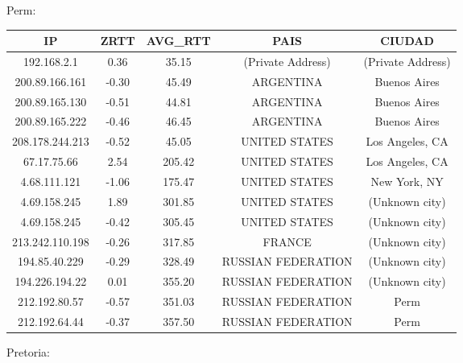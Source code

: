Perm:

\begin{tabular}{|c@{\hspace{5ex}}c@{\hspace{5ex}}c@{\hspace{5ex}}c@{\hspace{5ex}}c|}
 \hline
 \rule{0pt}{1.2em}IP & ZRTT & AVG\_RTT & PAIS & CIUDAD\\[0.2em]
 \hline

\rule{0pt}{1.2em} 192.168.2.1  &  0.36 & 35.15 & (Private Address) & (Private Address) \\[0.2em]
\rule{0pt}{1.2em} 200.89.166.161  &  -0.30 & 45.49 & ARGENTINA & Buenos Aires \\[0.2em]
\rule{0pt}{1.2em} 200.89.165.130  &  -0.51 & 44.81 & ARGENTINA & Buenos Aires \\[0.2em]
\rule{0pt}{1.2em} 200.89.165.222  &  -0.46 & 46.45 & ARGENTINA & Buenos Aires \\[0.2em]
\rule{0pt}{1.2em} 208.178.244.213  &  -0.52 & 45.05 & UNITED STATES & Los Angeles, CA \\[0.2em]
\rule{0pt}{1.2em} 67.17.75.66  &  2.54 & 205.42 & UNITED STATES & Los Angeles, CA \\[0.2em]
\rule{0pt}{1.2em} 4.68.111.121  &  -1.06 & 175.47 & UNITED STATES & New York, NY \\[0.2em]
\rule{0pt}{1.2em} 4.69.158.245  &  1.89 & 301.85 & UNITED STATES & (Unknown city) \\[0.2em]
\rule{0pt}{1.2em} 4.69.158.245  &  -0.42 & 305.45 & UNITED STATES & (Unknown city) \\[0.2em]
\rule{0pt}{1.2em} 213.242.110.198  &  -0.26 & 317.85 & FRANCE & (Unknown city) \\[0.2em]
\rule{0pt}{1.2em} 194.85.40.229  &  -0.29 & 328.49 & RUSSIAN FEDERATION & (Unknown city) \\[0.2em]
\rule{0pt}{1.2em} 194.226.194.22  &  0.01 & 355.20 & RUSSIAN FEDERATION & (Unknown city) \\[0.2em]
\rule{0pt}{1.2em} 212.192.80.57  &  -0.57 & 351.03 & RUSSIAN FEDERATION & Perm \\[0.2em]
\rule{0pt}{1.2em} 212.192.64.44  &  -0.37 & 357.50 & RUSSIAN FEDERATION & Perm \\[0.2em]
\hline
 \end{tabular}

Pretoria:

